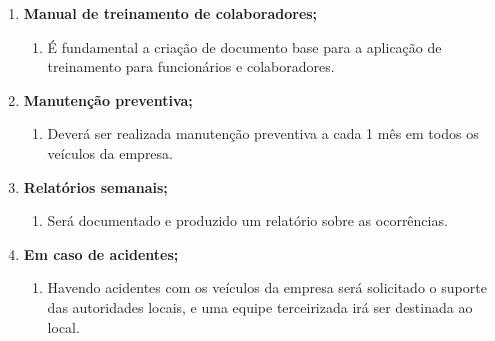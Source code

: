 \begin{enumerate}
\begin{enumerate}
            \end{enumerate}

      \item \textbf{Manual de treinamento de colaboradores;}
            \begin{enumerate}

                  \item	É fundamental a criação de documento base para a aplicação de treinamento para funcionários e colaboradores.



            \end{enumerate}

      \item \textbf{Manutenção preventiva;}
            \begin{enumerate}

                  \item	Deverá ser realizada manutenção preventiva a cada 1 mês em todos os veículos da empresa.



            \end{enumerate}

      \item \textbf{Relatórios semanais;}
            \begin{enumerate}

                  \item	Será documentado e produzido um relatório sobre as ocorrências.



            \end{enumerate}


      \item \textbf{Em caso de acidentes; }
            \begin{enumerate}

                  \item	Havendo acidentes com os veículos da empresa será solicitado o suporte das autoridades locais, e uma equipe terceirizada irá ser destinada ao local.



            \end{enumerate}



\end{enumerate}
